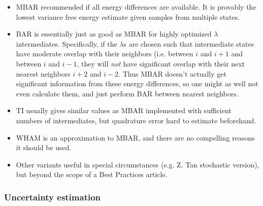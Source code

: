 \documentclass[9pt,bestpractices]{livecoms}
\begin{document}
\begin{itemize}
\item MBAR recommended if all energy differences are available. It is provably the lowest variance free energy estimate given samples from multiple states.
\item BAR is essentially just as good as MBAR for highly optimized $\lambda$ intermediates.  Specifically, if the $\lambda$s are chosen such that intermediate states have moderate overlap with their neighbors (i.e. between $i$ and $i+1$ and between $i$ and $i-1$, they will \textit{not} have significant overlap with their next nearest neighbors $i+2$ and $i-2$. Thus MBAR doesn't actually get significant information from these energy differences, so one might as well not even calculate them, and just perform BAR between nearest neighbors.~\cite{paliwal2011benchmark} 
\item TI usually gives similar values as MBAR implemented with sufficient numbers of intermediates, but quadrature error hard to estimate beforehand.~\cite{paliwal2011benchmark}
\item WHAM is an approximation to MBAR, and there are no compelling reasons it should be used. 
\item Other variants useful in special circumstances (e.g. Z. Tan stochastic version), but beyond the scope of a Best Practices article.
\end{itemize}


\subsubsection*{Uncertainty estimation}
\end{document}
